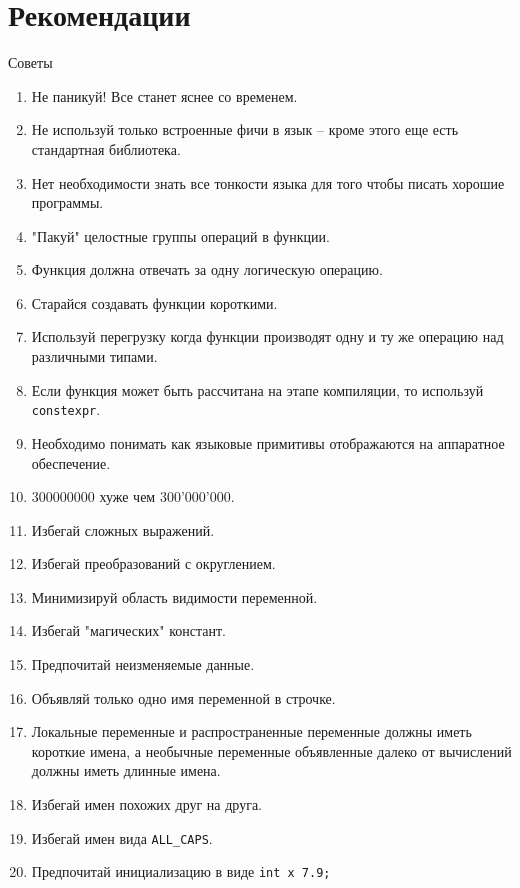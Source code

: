 \documentclass[
    9pt,
    hyperref={pdfencoding=unicode}
    ]{beamer}
\theoremstyle{definition}
\begin{document}
\section{Рекомендации}
\begin{frame}[t,allowframebreaks]{Советы}
    \begin{enumerate}
        \item Не паникуй!\textcopyright  \: Все станет яснее со временем.
        \item Не используй только встроенные фичи в язык -- кроме этого еще есть стандартная библиотека.
        \item Нет необходимости знать все тонкости языка для того чтобы писать хорошие программы.
        \item "Пакуй" целостные группы операций в функции.
        \item Функция должна отвечать за одну логическую операцию.
        \item Старайся создавать функции короткими.
        \item Используй перегрузку когда функции производят одну и ту же операцию над различными типами.
        \item Если функция может быть рассчитана на этапе компиляции, то используй \texttt{constexpr}. 
        \item Необходимо понимать как языковые примитивы отображаются на аппаратное обеспечение.
        \item 300000000 хуже чем 300'000'000.
        \item Избегай сложных выражений.
        \item Избегай преобразований с округлением.
        \item Минимизируй область видимости переменной.
        \item Избегай "магических" констант.
        \item Предпочитай неизменяемые данные.
        \item Объявляй только одно имя переменной в строчке.
        \item Локальные переменные и распространенные переменные должны иметь короткие имена, а необычные переменные объявленные далеко от вычислений должны иметь длинные имена.
        \item Избегай имен похожих друг на друга.
        \item Избегай имен вида \texttt{ALL_CAPS}.
        \item Предпочитай инициализацию в виде \texttt{int x {7.9};}

\end{enumerate}
\end{frame}
\end{document}

